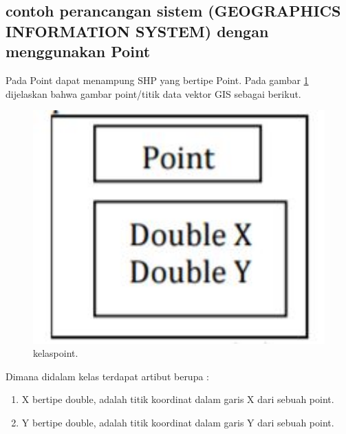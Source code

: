 \begin{enumerate}
\section{contoh perancangan sistem (GEOGRAPHICS INFORMATION SYSTEM) dengan menggunakan Point}
Pada Point dapat menampung SHP yang bertipe Point.
Pada gambar \ref{kelaspoint} dijelaskan bahwa gambar point/titik data vektor GIS sebagai berikut.
\begin{figure}[ht]
	\centerline{\includegraphics[width=1\textwidth]{figures/kelaspoint.JPG}}
	\caption{kelaspoint.}
	\label{kelaspoint}
	\end{figure}
Dimana didalam kelas terdapat artibut berupa :
\begin{enumerate}
\item X bertipe double, adalah titik koordinat dalam garis X dari sebuah point.
\item Y bertipe double, adalah titik koordinat dalam garis Y dari sebuah point.
\end{enumerate}

\end{enumerate}
